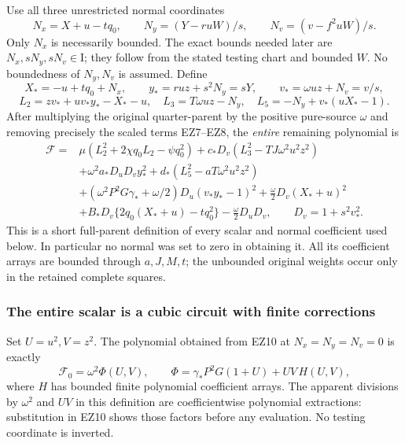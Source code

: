 Use all three unrestricted normal coordinates
\[
 N_x=X+u-tq_0,\qquad
 N_y=(Y-ruW)/s,\qquad N_v=(v-f^2uW)/s.
                                                               \tag{EZ9}
\]
Only $N_x$ is necessarily bounded. The exact bounds needed later are
$N_x,sN_y,sN_v\in\mathrm I$; they follow from the stated testing
chart and bounded $W$. No boundedness of $N_y,N_v$ is assumed.
Define
\[
 X_*=-u+tq_0+N_x,\qquad
 y_*=ruz+s^2N_y=sY,\qquad
 v_*=\omega uz+N_v=v/s,
\]
\[
 L_2=zv_*+uv_*y_*-X_*-u,\quad
 L_3=T\omega uz-N_y,\quad
 L_5=-N_y+v_*(uX_*-1).
\]
After multiplying the original quarter-parent by the positive
pure-source $\omega$ and removing precisely the scaled terms
EZ7--EZ8, the \emph{entire} remaining polynomial is
\[
\begin{split}
\mathcal F={}&
 \mu(L_2^2+2\chi q_0L_2-\psi q_0^2)
 +c_*D_v(L_3^2-TJ\omega^2u^2z^2)\\
 &+\omega^2a_*D_uD_vy_*^2
 +d_*(L_5^2-aT\omega^2u^2z^2)\\
 &+(\omega^2P^2G\gamma_*+\omega/2)
                         D_u(v_*y_*-1)^2
 +\frac{\omega}{2}D_v(X_*+u)^2\\
 &+B_*D_v\{2q_0(X_*+u)-tq_0^2\}
                         -\frac{\omega}{2}D_uD_v,
 \qquad D_v=1+s^2v_*^2 .
\end{split}                                                     \tag{EZ10}
\]
This is a short full-parent definition of every scalar and normal
coefficient used below. In particular no normal was set to zero
in obtaining it. All its coefficient arrays are bounded through
$a,J,M,t$; the unbounded original weights occur only in the
retained complete squares.

\subsubsection*{The entire scalar is a cubic circuit with finite corrections}

Set $U=u^2,V=z^2$. The polynomial obtained from EZ10 at
$N_x=N_y=N_v=0$ is exactly
\[
 \mathcal F_0=\omega^2\Phi(U,V),\qquad
 \Phi=\gamma_*P^2G(1+U)+UV\,H(U,V),                            \tag{EZ11}
\]
where $H$ has bounded finite polynomial coefficient arrays.
The apparent divisions by $\omega^2$ and $UV$ in this definition
are coefficientwise polynomial extractions: substitution in EZ10
shows those factors before any evaluation. No testing coordinate
is inverted.

